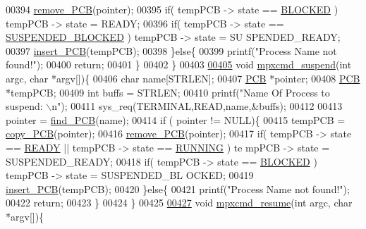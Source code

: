 \begin{DoxyCode}
00394                 \hyperlink{mpx__r2_8c_af30a3658210d449b4b53e5be2ed2bc2e}{remove_PCB}(pointer);
00395                 \textcolor{keywordflow}{if}( tempPCB -> state == \hyperlink{mpx__r2_8h_a48f6457243719e7031768d4100741159}{BLOCKED} ) tempPCB -> state = READY;
00396                 \textcolor{keywordflow}{if}( tempPCB -> state == \hyperlink{mpx__r2_8h_a6e41bb5a80c5049e8d364bab8ee4d73a}{SUSPENDED_BLOCKED} ) tempPCB -> state = SU
      SPENDED\_READY;
00397                 \hyperlink{mpx__r2_8c_aa3b334e3a5afd6e590917667ad359a6f}{insert_PCB}(tempPCB);
00398         \}\textcolor{keywordflow}{else}\{
00399                 printf(\textcolor{stringliteral}{"Process Name not found!"});
00400                 \textcolor{keywordflow}{return};
00401         \}
00402 \}
00403 
\hypertarget{mpx__r2_8c_source_l00405}{}\hyperlink{mpx__r2_8h_a697f0f432dba18606d9e514eda9cd073}{00405} \textcolor{keywordtype}{void} \hyperlink{mpx__r2_8c_a697f0f432dba18606d9e514eda9cd073}{mpxcmd_suspend}(\textcolor{keywordtype}{int} argc, \textcolor{keywordtype}{char} *argv[])\{
00406         \textcolor{keywordtype}{char} name[STRLEN];
00407         \hyperlink{structprocess}{PCB} *pointer;
00408         \hyperlink{structprocess}{PCB} *tempPCB;
00409         \textcolor{keywordtype}{int} buffs = STRLEN;
00410         printf(\textcolor{stringliteral}{"Name Of Process to suspend: \(\backslash\)n"});
00411         sys\_req(TERMINAL,READ,name,&buffs);
00412         
00413         pointer = \hyperlink{mpx__r2_8c_a612a6abcb66c688a32f33abc93ff3990}{find_PCB}(name);
00414         \textcolor{keywordflow}{if} ( pointer != NULL)\{
00415                 tempPCB = \hyperlink{mpx__r2_8c_aca3ad02d2b4c68f7653b0adf2c484ff6}{copy_PCB}(pointer);
00416                 \hyperlink{mpx__r2_8c_af30a3658210d449b4b53e5be2ed2bc2e}{remove_PCB}(pointer);
00417                 \textcolor{keywordflow}{if}( tempPCB -> state == \hyperlink{mpx__r2_8h_ad1235d5ce36f7267285e82dccd428aa6}{READY} || tempPCB -> state == \hyperlink{mpx__r2_8h_a6fb7181d994ee98e735494be55809708}{RUNNING} ) te
      mpPCB -> state = SUSPENDED\_READY;
00418                 \textcolor{keywordflow}{if}( tempPCB -> state == \hyperlink{mpx__r2_8h_a48f6457243719e7031768d4100741159}{BLOCKED} ) tempPCB -> state = SUSPENDED\_BL
      OCKED;
00419                 \hyperlink{mpx__r2_8c_aa3b334e3a5afd6e590917667ad359a6f}{insert_PCB}(tempPCB);
00420         \}\textcolor{keywordflow}{else}\{
00421                 printf(\textcolor{stringliteral}{"Process Name not found!"});
00422                 \textcolor{keywordflow}{return};
00423         \}
00424 \}
00425 
\hypertarget{mpx__r2_8c_source_l00427}{}\hyperlink{mpx__r2_8h_a3c47daf087934d234d896e35e4c03f3b}{00427} \textcolor{keywordtype}{void} \hyperlink{mpx__r2_8c_a3c47daf087934d234d896e35e4c03f3b}{mpxcmd_resume}(\textcolor{keywordtype}{int} argc, \textcolor{keywordtype}{char} *argv[])\{

\end{DoxyCode}
